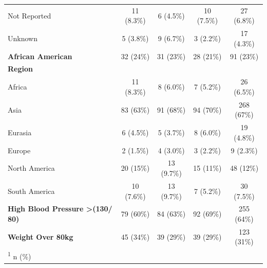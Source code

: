 \documentclass[
  12pt,
  letterpaper,
  DIV=11,
  numbers=noendperiod]{scrartcl}
\begin{document}
\begin{longtable}[l]{lcccc}
\hspace{1em}Not Reported & 11 (8.3\%) & 6 (4.5\%) & 10 (7.5\%) & 27 (6.8\%)\\
\hspace{1em}Unknown & 5 (3.8\%) & 9 (6.7\%) & 3 (2.2\%) & 17 (4.3\%)\\
\textbf{African American} & 32 (24\%) & 31 (23\%) & 28 (21\%) & 91 (23\%)\\
\textbf{Region} &  &  &  & \\
\hspace{1em}Africa & 11 (8.3\%) & 8 (6.0\%) & 7 (5.2\%) & 26 (6.5\%)\\
\hspace{1em}Asia & 83 (63\%) & 91 (68\%) & 94 (70\%) & 268 (67\%)\\
\hspace{1em}Eurasia & 6 (4.5\%) & 5 (3.7\%) & 8 (6.0\%) & 19 (4.8\%)\\
\hspace{1em}Europe & 2 (1.5\%) & 4 (3.0\%) & 3 (2.2\%) & 9 (2.3\%)\\
\hspace{1em}North America & 20 (15\%) & 13 (9.7\%) & 15 (11\%) & 48 (12\%)\\
\hspace{1em}South America & 10 (7.6\%) & 13 (9.7\%) & 7 (5.2\%) & 30 (7.5\%)\\
\textbf{High Blood Pressure   >(130/ 80)} & 79 (60\%) & 84 (63\%) & 92 (69\%) & 255 (64\%)\\
\textbf{Weight Over 80kg} & 45 (34\%) & 39 (29\%) & 39 (29\%) & 123 (31\%)\\*
\multicolumn{5}{l}{\rule{0pt}{1em}\textsuperscript{1} n (\%)}\\
\end{longtable}
\end{document}
